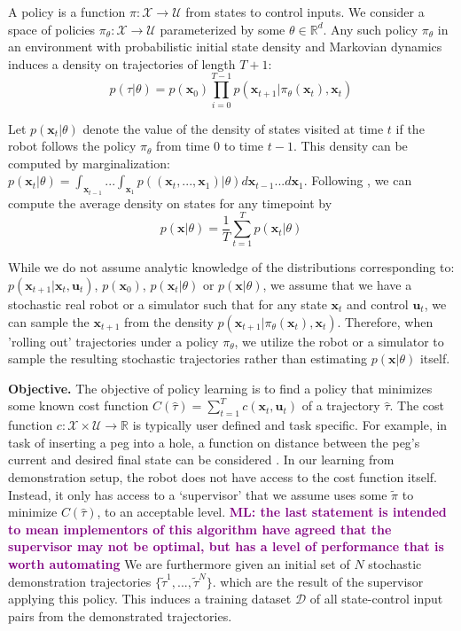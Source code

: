 \documentclass[10pt, conference]{ieeeconf}      %
\newcommand{\bu}{\mathbf{u}}
\newcommand{\bx}{\mathbf{x}}
\newcommand{\mlnote}[1]{\ifthenelse{\boolean{include-notes}}%
 {\textcolor{purple}{\textbf{ML: #1}}}{}}
\begin{document}
A policy is a function $\pi: \mathcal{X} \to \mathcal{U}$ from states to control inputs. 
We consider a space of policies $\pi_{\theta}:\mathcal{X}\to \mathcal{U}$ parameterized by some $\theta\in \mathbb{R}^d$. Any such policy $\pi_{\theta}$ in an environment with probabilistic initial state density and Markovian dynamics
induces a density on trajectories of length $T+1$: $$p(\tau | \theta)=
p(\bx_0)\prod_{i=0}^{T-1}p(\bx_{t+1}|\pi_{\theta}(\bx_t),\bx_t)$$


Let $p(\bx_t|\theta)$ denote the value of the density of states visited at time $t$ if the robot follows the policy
$\pi_{\theta}$ from time $0$ to time $t-1$. This density can be computed by marginalization: $p(\bx_t|\theta) =
\int_{\bx_{t-1}}...\int_{\bx_1} p((\bx_t,...,\bx_1)|\theta) d\bx_{t-1}...d\bx_1$. Following \cite{ross2010reduction}, we can compute
the average density on states for any timepoint by 
\begin{equation}
p(\bx|\theta) = \frac{1}{T} \sum^T_{t=1} p(\bx_t|\theta)
\label{eq:density}
\end{equation}


While we do not assume analytic knowledge of the distributions corresponding to: $p(\bx_{t+1}|\bx_t,\bu_t)$, $p(\bx_0)$, $p(\bx_t|
\theta)$ or $p(\bx|\theta)$, we assume that we have a stochastic real robot or a simulator such that for any state
$\bx_t$ and control $\bu_t$, we can sample the $\bx_{t+1}$ from the density $p(\bx_{t+1}|\pi_{\theta}(\bx_t),\bx_t)$. 
Therefore, when 'rolling out' trajectories under a policy
$\pi_{\theta}$, we utilize the robot or a simulator to sample the resulting stochastic trajectories rather than
estimating $p(\bx|\theta)$ itself.

\noindent\textbf{Objective.} The objective of policy learning is to find a policy that minimizes some known cost function
$C(\hat{\tau}) = \sum^T_{t=1} c(\bx_t,\bu_t)$ of a trajectory $\hat{\tau}$. The cost function $c:\mathcal{X}\times \mathcal{U}\to \mathbb{R}$ is typically user defined and task specific. 
For example, in task of inserting a peg into a hole, a function on distance between the peg's current and desired final state can
be considered \cite{levine2015end}.  
In our learning from demonstration setup, the robot does not have access to the cost function itself. Instead, it only has access to 
a `supervisor' that we assume uses some $\tilde{\pi}$ to minimize $C(\hat{\tau})$, to an acceptable level. \mlnote{the last statement is intended to mean implementors of this algorithm have agreed that the supervisor may not be optimal, but has a level of performance that is worth automating} We are furthermore given
an initial set of $N$ stochastic demonstration trajectories $\lbrace \tilde{\tau}^1,...,\tilde{\tau}^N \rbrace$. 
which are the result of the supervisor applying this policy. This induces a training dataset $\mathcal{D}$ of all state-control input pairs from the demonstrated trajectories. 
\end{document}
